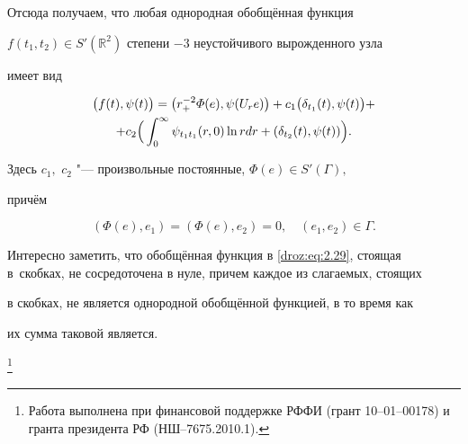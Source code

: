 Отсюда получаем, что любая однородная обобщённая функция

$f(t_1,t_2)\in S'(\mathbb R^2)$ степени $-3$ неустойчивого вырожденного узла

имеет вид

\begin{multline} 

\bigl(f(t),\psi(t)\bigr)=\bigl(r_{+}^{-2}\varPhi(e),\psi(U_re)\bigr)+ c_1\bigl(\delta_{t_1}(t),\psi(t)\bigr)+ \\ + c_2\Bigr(\int _0^{\infty}\psi_{t_1t_1}(r,0)\ln r

dr+(\delta_{t_2}(t),\psi(t))\Bigl).

\label{droz:eq:2.29}

\end{multline}

Здесь $c_1,$ $c_2$ "--- произвольные постоянные, $\varPhi(e) \in S'(\Gamma),$

причём

$$(\varPhi(e),e_1)=(\varPhi(e),e_2)=0,\quad (e_1,e_2)\in \Gamma.$$



Интересно заметить, что обобщённая функция в \eqref{droz:eq:2.29}, стоящая в~скобках, не сосредоточена в нуле, причем каждое из слагаемых, стоящих

в скобках, не является однородной обобщённой функцией, в то время как

их сумма таковой является.



\thanks{Работа выполнена при финансовой поддержке РФФИ (грант 10--01--00178) и гранта президента РФ  (НШ--7675.2010.1).}





